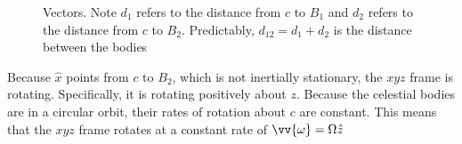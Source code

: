 \documentclass{article}
\begin{document}
\begin{figure}[H]
    \centering
    \caption{Vectors. Note $d_1$ refers to the distance from $c$ to $B_1$ and $d_2$ refers to the distance from $c$ to $B_2$. Predictably, $d_{12}=d_1+d_2$ is the distance between the bodies}
\end{figure}

Because $\hat{x}$ points from $c$ to $B_2$, which is not inertially stationary, the $xyz$ frame is rotating. Specifically, it is rotating positively about $z$. Because the celestial bodies are in a circular orbit, their rates of rotation about $c$ are constant. This means that the $xyz$ frame rotates at a constant rate of $\vv{\omega}=\Omega\hat{z}$ 
\end{document}
